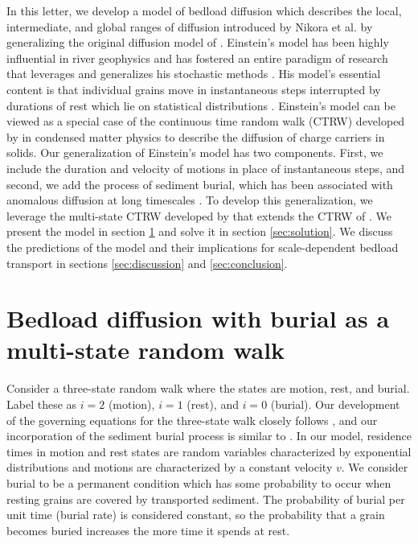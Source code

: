\documentclass[]{agujournal2018}
\begin{document}
In this letter, we develop a model of bedload diffusion which describes the local, intermediate, and global ranges of diffusion introduced by Nikora et al. by generalizing the original diffusion model of \citet{Einstein1937}.
Einstein's model has been highly influential in river geophysics and has fostered an entire paradigm of research that leverages and generalizes his stochastic methods \citep[e.g.][]{Hubbell1964, Yano1969, Yang1971, Gordon1972, Nakagawa1976}.
His model's essential content is that individual grains move in instantaneous steps interrupted by durations of rest which lie on statistical distributions \citep{Hassan1991}.
Einstein's model can be viewed as a special case of the continuous time random walk (CTRW) developed by \citet{Montroll1965} in condensed matter physics to describe the diffusion of charge carriers in solids.
Our generalization of Einstein's model has two components. First, we include the duration and velocity of motions in place of instantaneous steps, and second, we add the process of sediment burial, which has been associated with anomalous diffusion at long timescales \citep[e.g.][]{Bradley2017,Martin2014}.
To develop this generalization, we leverage the multi-state CTRW developed by \citet{Weiss1976, Weiss1994} that extends the CTRW of \citet{Montroll1965}.
We present the model in section \ref{sec:model} and solve it in section \ref{sec:solution}. We discuss the predictions of the model and their implications for scale-dependent bedload transport in sections \ref{sec:discussion} and \ref{sec:conclusion}.

\section{Bedload diffusion with burial as a multi-state random walk}
\label{sec:model}
Consider a three-state random walk where the states are motion, rest, and burial.
Label these as $i=2$ (motion), $i=1$ (rest), and $i=0$ (burial).
Our development of the governing equations for the three-state walk closely follows \citet{Weiss1994}, and our incorporation of the sediment burial process is similar to \citet{Schmidt2007}.
In our model, residence times in motion and rest states are random variables characterized by exponential distributions and motions are characterized by a constant velocity $v$.
We consider burial to be a permanent condition which has some probability to occur when resting grains are covered by transported sediment.
The probability of burial per unit time (burial rate) is considered constant, so the probability that a grain becomes buried increases the more time it spends at rest.
\end{document}
